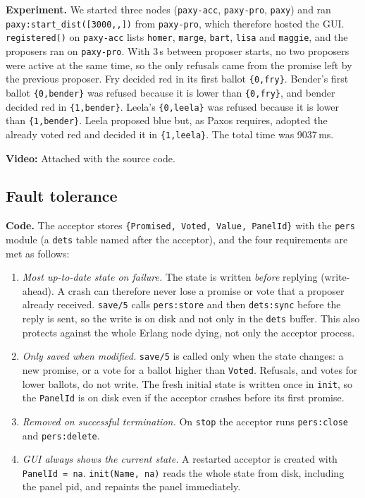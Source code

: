 \documentclass[a4paper, 10pt]{article}
\begin{document}
\textbf{Experiment.} We started three nodes (\texttt{paxy-acc}, \texttt{paxy-pro}, \texttt{paxy}) and ran
\texttt{paxy:start\_dist([3000,,])} from \texttt{paxy-pro}, which therefore hosted the GUI. \texttt{registered()} on \texttt{paxy-acc} lists \texttt{homer}, \texttt{marge}, \texttt{bart}, \texttt{lisa} and \texttt{maggie}, and the proposers ran on \texttt{paxy-pro}. With 3\,s between proposer starts, no two proposers were active at the same time, so the only refusals came from the promise left by the previous proposer. Fry decided red in its first ballot \texttt{\{0,fry\}}. Bender's first ballot \texttt{\{0,bender\}} was refused because it is lower than \texttt{\{0,fry\}}, and bender decided red in \texttt{\{1,bender\}}. Leela's \texttt{\{0,leela\}} was refused because it is lower than \texttt{\{1,bender\}}. Leela proposed blue but, as Paxos requires, adopted the already voted red and decided it in \texttt{\{1,leela\}}. The total time was 9037\,ms.

\noindent\textbf{Video:} Attached with the source code.

\subsection{Fault tolerance}

\textbf{Code.} The acceptor stores \texttt{\{Promised, Voted, Value, PanelId\}} with the \texttt{pers} module (a \texttt{dets} table named after the acceptor), and the four requirements are met as follows:

\begin{enumerate}
\item \emph{Most up-to-date state on failure.} The state is written \emph{before} replying (write-ahead). A crash can therefore never lose a promise or vote that a proposer already received. \texttt{save/5} calls \texttt{pers:store} and then \texttt{dets:sync} before the reply is sent, so the write is on disk and not only in the \texttt{dets} buffer. This also protects against the whole Erlang node dying, not only the acceptor process.
\item \emph{Only saved when modified.} \texttt{save/5} is called only when the state changes: a new promise, or a vote for a ballot higher than \texttt{Voted}. Refusals, and votes for lower ballots, do not write. The fresh initial state is written once in \texttt{init}, so the \texttt{PanelId} is on disk even if the acceptor crashes before its first promise.
\item \emph{Removed on successful termination.} On \texttt{stop} the acceptor runs \texttt{pers:close} and \texttt{pers:delete}.
\item \emph{GUI always shows the current state.} A restarted acceptor is created with \texttt{PanelId = na}. \texttt{init(Name, na)} reads the whole state from disk, including the panel pid, and repaints the panel immediately.
\end{enumerate}
\end{document}
